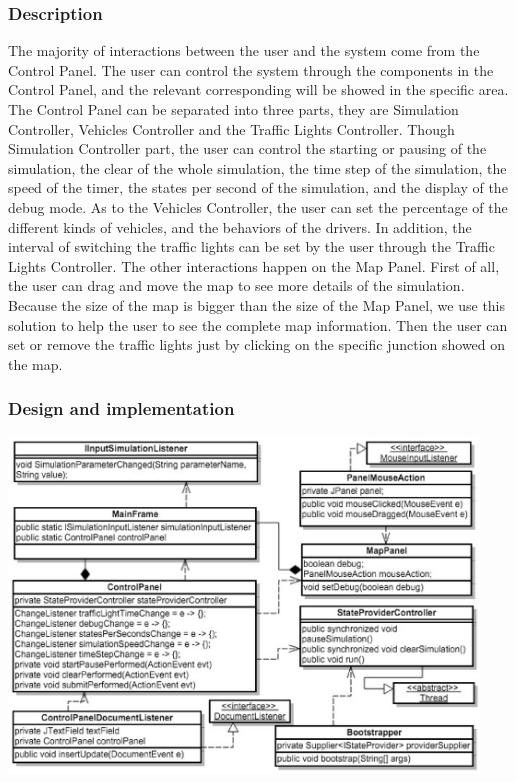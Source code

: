 \documentclass[a4paper,12pt]{article}
\begin{document}
\subsubsection{Description} The majority of interactions between the user and the system come from the Control Panel. The user can control the system through the components in the Control Panel, and the relevant corresponding will be showed in the specific area. The Control Panel can be separated into three parts, they are Simulation Controller, Vehicles Controller and the Traffic Lights Controller. Though Simulation Controller part, the user can control the starting or pausing of the simulation, the clear of the whole simulation, the time step of the simulation, the speed of the timer, the states per second of the simulation, and the display of the debug mode. As to the Vehicles Controller, the user can set the percentage of the different kinds of vehicles, and the behaviors of the drivers. In addition, the interval of switching the traffic lights can be set by the user through the Traffic Lights Controller.
The other interactions happen on the Map Panel. First of all, the user can drag and move the map to see more details of the simulation. Because the size of the map is bigger than the size of the Map Panel, we use this solution to help the user to see the complete map information. Then the user can set or remove the traffic lights just by clicking on the specific junction showed on the map.

\subsubsection{Design and implementation}
\includegraphics[width=12.5cm]{interactionClassGraph.eps}
\end{document}
